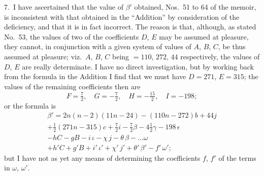 \documentclass[11pt,a4paper]{article}
\theoremstyle{plain}
\theoremstyle{definition}
\theoremstyle{remark}
\begin{document}
7.\ I have ascertained that the value of $\beta'$ obtained, Nos.~51 to 64 of the memoir, is inconsistent with that obtained in the ``Addition'' by consideration of the deficiency, and that it is in fact incorrect. The reason is that, although, as stated No.~53, the values of two of the coefficients $D$, $E$ may be assumed at pleasure, they cannot, in conjunction with a given system of values of $A$, $B$, $C$, be thus assumed at pleasure; viz.\ $A$, $B$, $C$ being $=110$, $272$, $44$ respectively, the values of $D$, $E$ are really determinate. I have no direct investigation, but by working back from the formula in the Addition I find that we must have $D=271$, $E=315$; the values of the remaining coefficients then are
\[
F=\tfrac{7}{2},\quad G=-\tfrac{7}{2},\quad H=-\tfrac{15}{2},\quad I=-198;
\]
or the formula is
\begin{multline*}
\beta'=2n(n-2)(11n-24)-(110n-272)b+44j\\
+\tfrac{1}{2}(271n-315)c+\tfrac{7}{2}i-\tfrac{7}{2}\beta-4\tfrac{1}{2}\gamma-198\,\epsilon\\
-hC-gB-i\,\iota-\chi\,j-\theta\,\beta-\ldots\omega\\
+h'C+g'B+i'\,\iota'+\chi'\,j'+\theta'\,\beta'-f'\,\omega';
\end{multline*}
but I have not as yet any means of determining the coefficients $f$, $f'$ of the terms in $\omega$, $\omega'$.

\newpage
\setcounter{page}{609}
\end{document}
